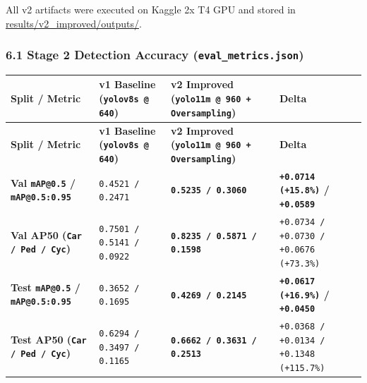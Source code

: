 \documentclass[10.5pt,a4paper]{article}
\begin{document}
All v2 artifacts were executed on Kaggle 2x T4 GPU and stored in \href{https://github.com/Heisnotanimposter/Totalcare\_autonomous\_driving\_Yolov5/tree/main/results/v2\_improved/outputs}{results/v2\_improved/outputs/}.


\subsubsection{6.1 Stage 2 Detection Accuracy (\texttt{eval\_\allowbreak{}metrics.\allowbreak{}json})}

\begin{footnotesize}
\setlength{\tabcolsep}{4pt}
\setlength{\LTleft}{0pt}\setlength{\LTright}{0pt}
\begin{longtable}{>{\raggedright\arraybackslash}p{} >{\raggedright\arraybackslash}p{} >{\raggedright\arraybackslash}p{} >{\raggedright\arraybackslash}p{}}
\toprule
\textbf{Split / Metric} & \textbf{v1 Baseline (\texttt{yolov8s @ 640})} & \textbf{v2 Improved (\texttt{yolo11m @ 960 + Oversampling})} & \textbf{Delta} \\
\midrule
\endfirsthead
\toprule
\textbf{Split / Metric} & \textbf{v1 Baseline (\texttt{yolov8s @ 640})} & \textbf{v2 Improved (\texttt{yolo11m @ 960 + Oversampling})} & \textbf{Delta} \\
\midrule
\endhead
\bottomrule
\endfoot
\textbf{Val \texttt{mAP@0.\allowbreak{}5} / \texttt{mAP@0.\allowbreak{}5:\allowbreak{}0.\allowbreak{}95}} & \texttt{0.\allowbreak{}4521 /\allowbreak{} 0.\allowbreak{}2471} & \textbf{\texttt{0.\allowbreak{}5235 /\allowbreak{} 0.\allowbreak{}3060}} & \textbf{\texttt{+0.\allowbreak{}0714 (+15.\allowbreak{}8\%)} / \texttt{+0.\allowbreak{}0589}} \\
\textbf{Val AP50 (\texttt{Car /\allowbreak{} Ped /\allowbreak{} Cyc})} & \texttt{0.\allowbreak{}7501 /\allowbreak{} 0.\allowbreak{}5141 /\allowbreak{} 0.\allowbreak{}0922} & \textbf{\texttt{0.\allowbreak{}8235 /\allowbreak{} 0.\allowbreak{}5871 /\allowbreak{} 0.\allowbreak{}1598}} & \texttt{+0.\allowbreak{}0734 /\allowbreak{} +0.\allowbreak{}0730 /\allowbreak{} +0.\allowbreak{}0676 (+73.\allowbreak{}3\%)} \\
\textbf{Test \texttt{mAP@0.\allowbreak{}5} / \texttt{mAP@0.\allowbreak{}5:\allowbreak{}0.\allowbreak{}95}} & \texttt{0.\allowbreak{}3652 /\allowbreak{} 0.\allowbreak{}1695} & \textbf{\texttt{0.\allowbreak{}4269 /\allowbreak{} 0.\allowbreak{}2145}} & \textbf{\texttt{+0.\allowbreak{}0617 (+16.\allowbreak{}9\%)} / \texttt{+0.\allowbreak{}0450}} \\
\textbf{Test AP50 (\texttt{Car /\allowbreak{} Ped /\allowbreak{} Cyc})} & \texttt{0.\allowbreak{}6294 /\allowbreak{} 0.\allowbreak{}3497 /\allowbreak{} 0.\allowbreak{}1165} & \textbf{\texttt{0.\allowbreak{}6662 /\allowbreak{} 0.\allowbreak{}3631 /\allowbreak{} 0.\allowbreak{}2513}} & \texttt{+0.\allowbreak{}0368 /\allowbreak{} +0.\allowbreak{}0134 /\allowbreak{} +0.\allowbreak{}1348 (+115.\allowbreak{}7\%)} \\
\end{longtable}
\end{footnotesize}
\end{document}
